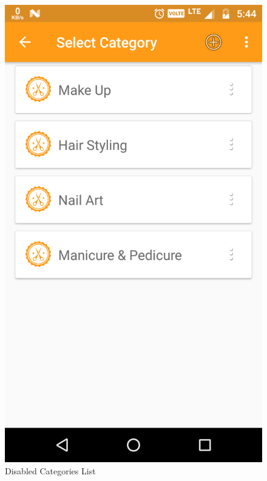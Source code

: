 \\
\begin{figure}[h]
	\centering
	\includegraphics[width=0.7\linewidth]{DisablesCategories}
	\caption{Disabled Categories List}
\end{figure}
\pagebreak

